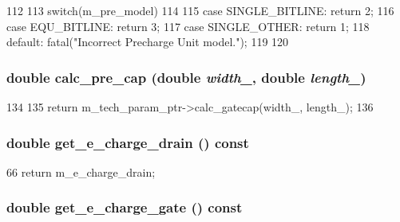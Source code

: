 \begin{DoxyCode}
112 {
113     switch(m_pre_model)
114     {
115         case SINGLE_BITLINE: return 2;
116         case EQU_BITLINE:    return 3;
117         case SINGLE_OTHER:   return 1;
118         default: fatal("Incorrect Precharge Unit model.\n");
119     }
120 }
\end{DoxyCode}
\hypertarget{classPrechargeUnit_a1cca7b8a2920e2de2a2e11241a35a4c4}{
\subsubsection[{calc\_\-pre\_\-cap}]{\setlength{\rightskip}{0pt plus 5cm}double calc\_\-pre\_\-cap (double {\em width\_\-}, \/  double {\em length\_\-})}}
\label{classPrechargeUnit_a1cca7b8a2920e2de2a2e11241a35a4c4}



\begin{DoxyCode}
134 {
135     return m_tech_param_ptr->calc_gatecap(width_, length_);
136 }
\end{DoxyCode}
\hypertarget{classPrechargeUnit_a2b5dce20f79e9bff15c7f8d75a6ef27a}{
\subsubsection[{get\_\-e\_\-charge\_\-drain}]{\setlength{\rightskip}{0pt plus 5cm}double get\_\-e\_\-charge\_\-drain () const}}
\label{classPrechargeUnit_a2b5dce20f79e9bff15c7f8d75a6ef27a}



\begin{DoxyCode}
66 { return m_e_charge_drain; }
\end{DoxyCode}
\hypertarget{classPrechargeUnit_a699c98317420ea768a113c525e522bca}{
\subsubsection[{get\_\-e\_\-charge\_\-gate}]{\setlength{\rightskip}{0pt plus 5cm}double get\_\-e\_\-charge\_\-gate () const}}
\label{classPrechargeUnit_a699c98317420ea768a113c525e522bca}




